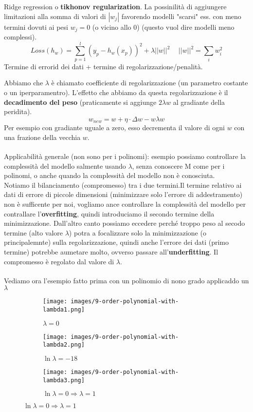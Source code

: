 \begin{definition}
    Ridge regression o \textbf{tikhonov regularization}. La possinilità di aggiungere limitazioni alla somma di valori di $|w_j|$ favorendo modelli "scarsi" ess. con 
    meno termini dovuti ai pesi $w_j = 0$ (o vicino allo 0) (questo vuol dire modelli meno complessi).
    $$Loss(h_w) = \sum_{p=1}^{l}(y_p - h_w(x_p))^2 + \lambda||w||^2 \hspace{15pt} ||w||^2 = \sum_{i}w_i^2$$
    Termine di errorid dei dati + termine di regolarizzazione/penalità.
\end{definition}
\hspace{-15pt}Abbiamo che $\lambda$ è chiamato coefficiente di regolarizzazione (un parametro costante o un iperparamentro). L'effetto che abbiamo 
da questa regolarizzazione è il \textbf{decadimento del peso} (praticamente si aggiunge $2\lambda w$ al gradiante della peridita).
$$w_{new} = w + \eta \cdot \Delta w - w \lambda w$$
Per esempio con gradiante uguale a zero, esso decrementa il valore di ogni $w$ con una frazione della vecchia $w$.\\\\
Applicabilità generale (non sono per i polinomi): esempio possiamo controllare la complessità del modello salmente usando $\lambda$, senza conoscere
M come per i polinomi, o anche quando la complessità del modello non è conosciuta. \\
Notiamo il bilanciamento (compromesso) tra i due termini.Il termine relativo ai dati di errore di piccole dimensioni (minimizzare solo l'errore di addestramento) non
è sufficente per noi, vogliamo ance controllare la complessità del modello per contrallare l'\textbf{overfitting}, quindi introduciamo il secondo termine della minimizzazione.
Dall'altro canto possiamo eccedere perché troppo peso al secodo termine (alto valore $\lambda$) potra a focalizzare solo la minimizzazione (o principalemnte) sulla regolarizzazione,
quindi anche l'errore dei dati (primo termine) potrebbe aumetare molto, ovverso passare all'\textbf{underfitting}. Il compromesso è regolato dal valore di $\lambda$. 
\\\\Vediamo ora l'esempio fatto prima con un polinomio di nono grado applicaddo un $\lambda$
\begin{figure}[h!]
    \centering
    \begin{subfigure}{.3\textwidth}
        \texttt{[image: images/9-order-polynomial-with-lambda1.png]}
        \caption{$\lambda = 0$}
    \end{subfigure}
    \begin{subfigure}{.3\textwidth}
        \texttt{[image: images/9-order-polynomial-with-lambda2.png]}
        \caption{$\ln\lambda = -18$}
    \end{subfigure}
    \begin{subfigure}{.3\textwidth}
        \texttt{[image: images/9-order-polynomial-with-lambda3.png]}
        \caption{$\ln\lambda = 0 \Rightarrow \lambda = 1$}
    \end{subfigure}
\end{figure}
